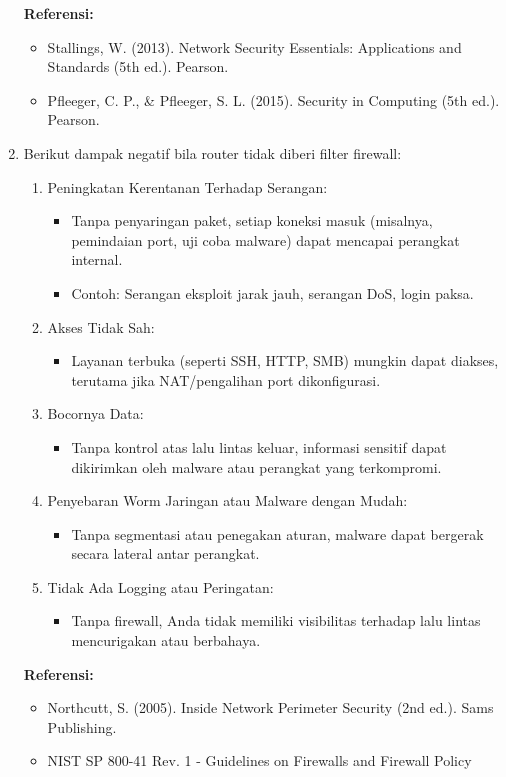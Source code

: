 \begin{enumerate}
	\textbf{Referensi:} 
	\begin{itemize}
		\item Stallings, W. (2013). Network Security Essentials: 
		Applications and Standards (5th ed.). Pearson.
		\item Pfleeger, C. P., \& Pfleeger, S. L. (2015). Security 
		in Computing (5th ed.). Pearson.
	\end{itemize}
	\item Berikut dampak negatif bila router tidak diberi filter 
	firewall:
	\begin{enumerate}
		\item Peningkatan Kerentanan Terhadap Serangan:
		\begin{itemize}
			\item Tanpa penyaringan paket, setiap koneksi masuk 
			(misalnya, pemindaian port, uji coba malware) dapat 
			mencapai perangkat internal.
			\item Contoh: Serangan eksploit jarak jauh, serangan 
			DoS, login paksa.
		\end{itemize}
		\item Akses Tidak Sah:
		\begin{itemize}
			\item Layanan terbuka (seperti SSH, HTTP, SMB) mungkin 
			dapat diakses, terutama jika NAT/pengalihan port 
			dikonfigurasi.
		\end{itemize}
		\item Bocornya Data:
		\begin{itemize}
			\item Tanpa kontrol atas lalu lintas keluar, 
			informasi sensitif dapat dikirimkan oleh malware 
			atau perangkat yang terkompromi.
		\end{itemize}
		\item Penyebaran Worm Jaringan atau Malware dengan 
		Mudah:
		\begin{itemize}
			\item Tanpa segmentasi atau penegakan aturan, 
			malware dapat bergerak secara lateral antar 
			perangkat.
		\end{itemize}
		\item Tidak Ada Logging atau Peringatan:
		\begin{itemize}
			\item Tanpa firewall, Anda tidak memiliki 
			visibilitas terhadap lalu lintas mencurigakan atau 
			berbahaya.
		\end{itemize}
	\end{enumerate}
	\textbf{Referensi:}
	\begin{itemize}
		\item Northcutt, S. (2005). Inside Network Perimeter 
		Security (2nd ed.). Sams Publishing.
		\item NIST SP 800-41 Rev. 1 - Guidelines on Firewalls 
		and Firewall Policy
	\end{itemize}
\end{enumerate}
